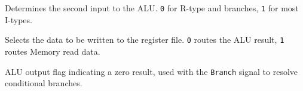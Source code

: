 \begin{vocabulary}[ALUSrc]
Determines the second input to the ALU. \texttt{0} for R-type and branches, \texttt{1} for most I-types.
\end{vocabulary}

\begin{vocabulary}[MemtoReg]
Selects the data to be written to the register file. \texttt{0} routes the ALU result, \texttt{1} routes Memory read data.
\end{vocabulary}

\begin{vocabulary}[Zero]
ALU output flag indicating a zero result, used with the \texttt{Branch} signal to resolve conditional branches.
\end{vocabulary}
